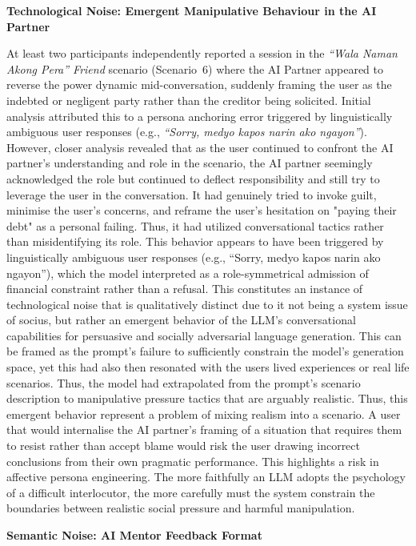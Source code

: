 \noindent\textbf{Technological Noise: Emergent Manipulative Behaviour in the AI Partner}


At least two participants independently reported a session in the 
\textit{``Wala Naman Akong Pera'' Friend} scenario (Scenario~6) where the AI 
Partner appeared to reverse the power dynamic mid-conversation, suddenly framing 
the user as the indebted or negligent party rather than the creditor being 
solicited. Initial analysis attributed this to a persona anchoring error 
triggered by linguistically ambiguous user responses (e.g., 
\textit{``Sorry, medyo kapos narin ako ngayon''}). However, closer analysis revealed that as the
user continued to confront the AI partner's understanding and role in the scenario, the AI partner seemingly
acknowledged the role but continued to deflect responsibility and still try to leverage the user in the conversation. 
It had genuinely tried to invoke guilt, minimise the user's concerns, and reframe the user's hesitation on "paying their debt" 
as a personal failing. Thus, it had utilized conversational tactics rather than misidentifying its role. This behavior appears to have been triggered by linguistically ambiguous user responses (e.g., ``Sorry, medyo kapos 
narin ako ngayon''), which the model interpreted as a role-symmetrical admission of financial constraint 
rather than a refusal. This constitutes an instance of technological noise that is qualitatively distinct due to it not being a system issue of socius, but rather an 
emergent behavior of the LLM's conversational capabilities for persuasive and socially adversarial language generation. This can be framed as the 
prompt's failure to sufficiently constrain the model's generation space, yet this had also then resonated with the users lived experiences or real life scenarios.
Thus, the model had extrapolated from the prompt's scenario description to manipulative pressure tactics that are arguably realistic. Thus, this emergent behavior
represent a problem of mixing realism into a scenario. A user that would internalise the AI partner's framing of a situation that requires them to resist rather than accept
blame would risk the user drawing incorrect conclusions from their own pragmatic performance. This highlights a risk in affective persona engineering. The more faithfully an LLM adopts the psychology of a difficult interlocutor, the more carefully must the system constrain the boundaries
between realistic social pressure and harmful manipulation.


\noindent\textbf{Semantic Noise: AI Mentor Feedback Format}

